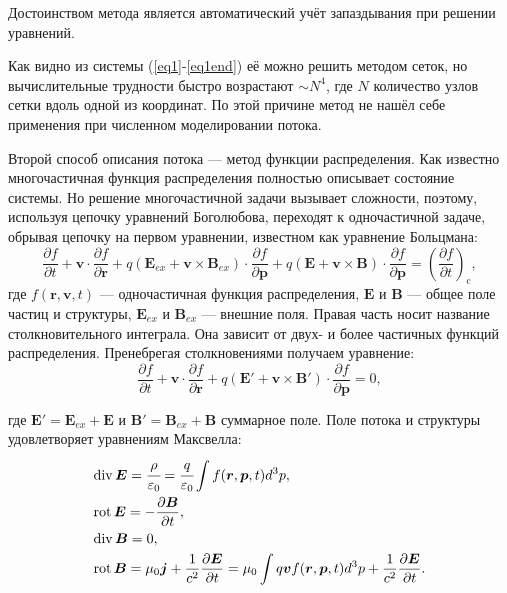 \documentclass[a4paper,14pt]{extreport} %
\newcommand{\dff}[2]{\frac{\partial #1}{\partial #2}}
\renewcommand{\vec}[1]{\bm{#1}}
\renewcommand{\div}{\mathrm{div}\,}
\newcommand{\rot}{\mathrm{rot}\,}
\newcommand{\eps}{\varepsilon}
\begin{document}
Достоинством метода является автоматический учёт запаздывания при решении уравнений.

Как видно из системы (\ref{eq1}-\ref{eq1end}) её можно решить методом сеток, но  вычислительные трудности быстро возрастают $\sim N^4$, где $N$ количество узлов сетки вдоль одной из координат. По этой причине метод не нашёл себе применения при численном моделировании потока.

Второй способ описания потока --- метод функции распределения. Как известно многочастичная функция распределения полностью описывает состояние системы. Но решение многочастичной задачи вызывает сложности, поэтому, используя цепочку уравнений Боголюбова, переходят к одночастичной задаче, обрывая цепочку на первом уравнении, известном как уравнение Больцмана:
\begin{equation}
\dff{f}{t} + 
\vec{v}\cdot \dff{f}{\vec{r}} +
q (\vec{E}_{ex} + \vec{v}\times \vec{B}_{ex})\cdot \dff{f}{\vec{p}} +
q (\vec{E} + \vec{v}\times \vec{B})\cdot\dff{f}{\vec{p}}
=\left(\dff{f}{t} \right)_\text{c},
\end{equation}
где $f(\vec{r}, \vec{v}, t)$ --- одночастичная функция распределения, $\vec{E}$ и $\vec{B}$ --- общее поле частиц и структуры, $\vec{E}_{ex}$ и $\vec{B}_{ex}$ --- внешние поля. Правая часть носит название столкновительного интеграла. Она зависит от двух- и более частичных функций распределения. Пренебрегая столкновениями получаем уравнение:
\begin{equation}\label{eq: vlasov}
\dff{f}{t} + 
\vec{v}\cdot \dff{f}{\vec{r}} +
q (\vec{E}' + \vec{v}\times \vec{B}')\cdot\dff{f}{\vec{p}}
= 0,
\end{equation}

где $\vec{E}' = \vec{E}_{ex} + \vec{E}$ и $\vec{B}' = \vec{B}_{ex} + \vec{B}$ суммарное поле. Поле потока и структуры удовлетворяет уравнениям Максвелла:
\begin{equation}\label{eq: samosogl}
\begin{split}
& \div \vec{E} = \cfrac{\rho}{\eps_0} = 
\cfrac{q}{\eps_0} \int f(\vec{r}, \vec{p}, t) d^3p, \\
& \rot \vec{E} = - \dff{\vec{B}}{t}, \\
& \div \vec{B} = 0, \\
& \rot \vec{B} = \mu_0 \vec{j}+ \frac{1}{c^2}\dff{\vec{E}}{t} = 
\mu_0 \int q\vec{v} f(\vec{r}, \vec{p}, t) d^3p + 
\frac{1}{c^2}\dff{\vec{E}}{t}.
\end{split}
\end{equation}
\end{document}
